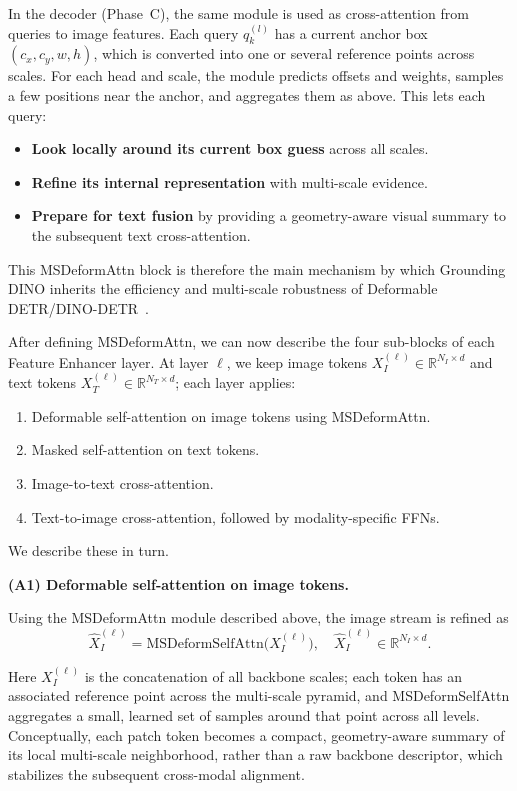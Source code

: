 \begin{enrichment}
\begin{enrichment}[Method][subsection]
		In the decoder (Phase~C), the same module is used as cross-attention from queries to image features. Each query \(q_k^{(l)}\) has a current anchor box \((c_x,c_y,w,h)\), which is converted into one or several reference points across scales. For each head and scale, the module predicts offsets and weights, samples a few positions near the anchor, and aggregates them as above. This lets each query:
		\begin{itemize}
			\item \textbf{Look locally around its current box guess} across all scales.
			\item \textbf{Refine its internal representation} with multi-scale evidence.
			\item \textbf{Prepare for text fusion} by providing a geometry-aware visual summary to the subsequent text cross-attention.
		\end{itemize}
		This MSDeformAttn block is therefore the main mechanism by which Grounding DINO inherits the efficiency and multi-scale robustness of Deformable DETR/DINO-DETR~\cite{zhu2021_deformabledetr,zhang2022_dino}.
		
		\medskip
		
		\noindent After defining MSDeformAttn, we can now describe the four sub-blocks of each Feature Enhancer layer. At layer \(\ell\), we keep image tokens \(X_I^{(\ell)} \in \mathbb{R}^{N_I \times d}\) and text tokens \(X_T^{(\ell)} \in \mathbb{R}^{N_T \times d}\); each layer applies:
		\begin{enumerate}
			\item Deformable self-attention on image tokens using MSDeformAttn.
			\item Masked self-attention on text tokens.
			\item Image-to-text cross-attention.
			\item Text-to-image cross-attention, followed by modality-specific FFNs.
		\end{enumerate}
		We describe these in turn.
		
		\medskip
		
		\noindent\textbf{(A1) Deformable self-attention on image tokens.}
		
		Using the MSDeformAttn module described above, the image stream is refined as
		\[
		\hat{X}_I^{(\ell)} = \text{MSDeformSelfAttn}\bigl(X_I^{(\ell)}\bigr), \quad \hat{X}_I^{(\ell)} \in \mathbb{R}^{N_I \times d}.
		\]
		
		\newpage
		
		Here \(X_I^{(\ell)}\) is the concatenation of all backbone scales; each token has an associated reference point across the multi-scale pyramid, and MSDeformSelfAttn aggregates a small, learned set of samples around that point across all levels. Conceptually, each patch token becomes a compact, geometry-aware summary of its local multi-scale neighborhood, rather than a raw backbone descriptor, which stabilizes the subsequent cross-modal alignment.
		

\end{enrichment}
\end{enrichment}
